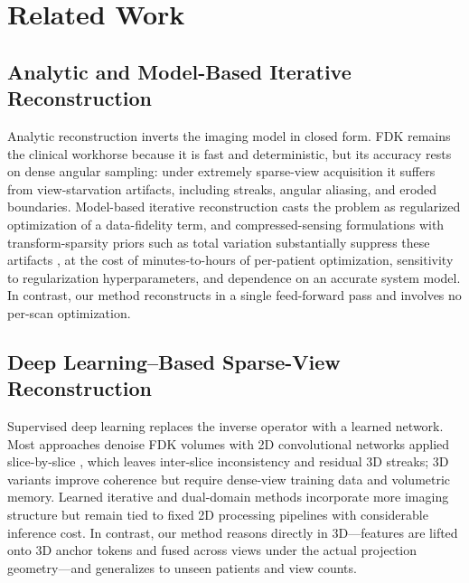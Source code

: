 
\section{Related Work}
\label{sec:related}

\subsection{Analytic and Model-Based Iterative Reconstruction}
\label{sec:related:analytic}

Analytic reconstruction inverts the imaging model in closed form. FDK
\cite{feldkamp1984practical} remains the clinical workhorse because it is fast
and deterministic, but its accuracy rests on dense angular sampling: under
extremely sparse-view acquisition it suffers from view-starvation artifacts,
including streaks, angular aliasing, and eroded boundaries. Model-based
iterative reconstruction casts the problem as regularized optimization of a
data-fidelity term, and compressed-sensing formulations with transform-sparsity
priors such as total variation substantially suppress these artifacts
\cite{sidky2008image}, at the cost of minutes-to-hours of per-patient
optimization, sensitivity to regularization hyperparameters, and dependence on
an accurate system model. In contrast, our method reconstructs in a single
feed-forward pass and involves no per-scan optimization.

\subsection{Deep Learning--Based Sparse-View Reconstruction}
\label{sec:related:dl}

Supervised deep learning replaces the inverse operator with a learned network.
Most approaches denoise FDK volumes with 2D convolutional networks applied
slice-by-slice \cite{chen2017redcnn,kang2017deep}, which leaves inter-slice
inconsistency and residual 3D streaks; 3D variants improve coherence
\cite{shan2019competitive} but require dense-view training data and volumetric
memory. Learned iterative and dual-domain methods
\cite{adler2018learned,peng2022dudotrans} incorporate more imaging structure
but remain tied to fixed 2D processing pipelines with considerable inference
cost. In contrast, our method reasons directly in 3D---features are lifted
onto 3D anchor tokens and fused across views under the actual projection
geometry---and generalizes to unseen patients and view counts.

